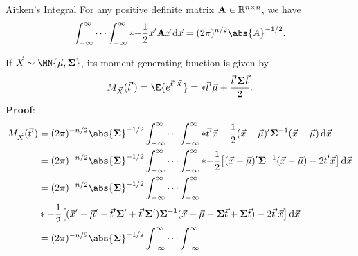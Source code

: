 \begin{Remark}{Aitken's Integral}{}
    For any positive definite matrix $ \mathbf{A}\in\mathbb{R}^{n\times n} $, we have
    \[ \int_{-\infty}^{\infty}\cdots\int_{-\infty}^{\infty}\exp*{-\frac{1}{2}\Vector{x}'\Matrix{A}\Vector{x}}\odif{\Vector{x}}
        =(2\pi)^{n/2}\abs{A}^{-1/2}. \]
\end{Remark}
\begin{Theorem}{}{}
    If $ \Vector{X}\sim \MN{\Vector{\mu},\Matrix{\Sigma}} $, its moment generating function is given by
    \[ M_{\Vector{X}}(\Vector{t}')=\E{e^{\Vector{t}'\Vector{X}}}=\exp*{\Vector{t}'\Vector{\mu}+\frac{\Vector{t}'\Matrix{\Sigma}\Vector{t}}{2}}. \]
    \tcblower{}
    \textbf{Proof}:
    \begin{align*}
        M_{\Vector{X}}(\Vector{t}')
         & =(2\pi)^{-n/2}\abs{\Matrix{\Sigma}}^{-1/2}
        \int_{-\infty}^{\infty}\cdots\int_{-\infty}^{\infty}\exp*{\Vector{t}'\Vector{x}-\frac{1}{2}(\Vector{x}-\Vector{\mu})'\Matrix{\Sigma}^{-1}(\Vector{x}-\Vector{\mu})}\odif{\Vector{x}}                                                                                          \\
         & =(2\pi)^{-n/2}\abs{\Matrix{\Sigma}}^{-1/2}
        \int_{-\infty}^{\infty}\cdots\int_{-\infty}^{\infty}\exp*{-\frac{1}{2}\bigl[(\Vector{x}-\Vector{\mu})'\Matrix{\Sigma}^{-1}(\Vector{x}-\Vector{\mu})-2 \Vector{t}'\Vector{x}\bigr]}\odif{\Vector{x}}                                                                           \\
         & =(2\pi)^{-n/2}\abs{\Matrix{\Sigma}}^{-1/2}
        \int_{-\infty}^{\infty}\cdots\int_{-\infty}^{\infty}                                                                                                                                                                                                                          \\
         & \exp*{-\frac{1}{2}\bigl[(\Vector{x}'-\Vector{\mu}'-\Vector{t}'\Matrix{\Sigma}'+\Vector{t}'\Matrix{\Sigma}')\Matrix{\Sigma}^{-1}(\Vector{x}-\Vector{\mu}-\Matrix{\Sigma}\Vector{t}+\Matrix{\Sigma}\Vector{t})-2 \Vector{t}'\Vector{x}\bigr]}\odif{\Vector{x}}               \\
         & =(2\pi)^{-n/2}\abs{\Matrix{\Sigma}}^{-1/2}
        \int_{-\infty}^{\infty}\cdots\int_{-\infty}^{\infty}                                                                                                                                                                                                                          \\

\end{align*}
\end{Theorem}
